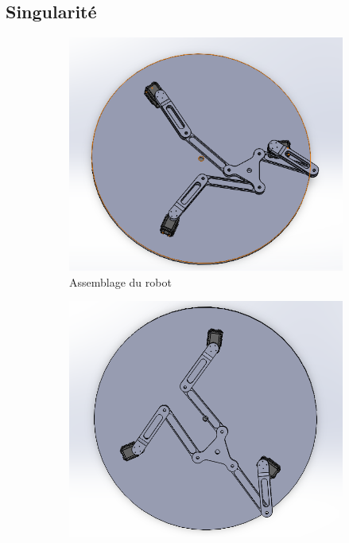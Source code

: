 \documentclass[a4paper, 11pt]{report}
\begin{document}
\subsection{Singularité}

\begin{figure}[!tbh]
    \centering
    \begin{subfigure}[t]{0.48\textwidth}
        \centering
        \includegraphics[width=\textwidth]{Figures/singularité série.png}
        \caption{Assemblage du robot}
    \end{subfigure}
    \hfill
    \begin{subfigure}[t]{0.48\textwidth}
        \centering
        \includegraphics[width=\textwidth]{Figures/singularité parallèle.png}

\end{subfigure}
\end{figure}
\end{document}
